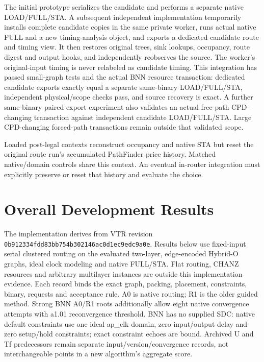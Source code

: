 \documentclass[conference,10pt]{IEEEtran}
\begin{document}
The initial prototype serializes the candidate and performs a separate native LOAD/FULL/STA. A subsequent independent implementation temporarily installs complete candidate copies in the same private worker, runs actual native FULL and a new timing-analysis object, and exports a dedicated candidate route and timing view. It then restores original trees, sink lookups, occupancy, route digest and output hooks, and independently reobserves the source. The worker's original-input timing is never relabeled as candidate timing. This integration has passed small-graph tests and the actual BNN resource transaction: dedicated candidate exports exactly equal a separate same-binary LOAD/FULL/STA, independent physical/scope checks pass, and source recovery is exact. A further same-binary paired export experiment also validates an actual free-path CPD-changing transaction against independent candidate LOAD/FULL/STA. Large CPD-changing forced-path transactions remain outside that validated scope.

Loaded post-legal contexts reconstruct occupancy and native STA but reset the original route run's accumulated PathFinder price history. Matched native/domain controls share this context. An eventual in-router integration must explicitly preserve or reset that history and evaluate the choice.

\section{Overall Development Results}
The implementation derives from VTR revision \texttt{0b912334fdd83bb754b302146ac0d1ec9edc9a0e}. Results below use fixed-input serial clustered routing on the evaluated two-layer, edge-encoded Hybrid-O graphs, ideal clock modeling and native FULL/STA. Flat routing, CHANZ resources and arbitrary multilayer instances are outside this implementation evidence. Each record binds the exact graph, packing, placement, constraints, binary, requests and acceptance rule. A0 is native routing; R1 is the older guided method. Strong BNN A0/R1 roots additionally allow eight native convergence attempts with a1.01 reconvergence threshold. BNN has no supplied SDC: native default constraints use one ideal ap\_clk domain, zero input/output delay and zero setup/hold constraints; exact constraint echoes are bound. Archived U and Tf predecessors remain separate input/version/convergence records, not interchangeable points in a new algorithm's aggregate score.
\end{document}
